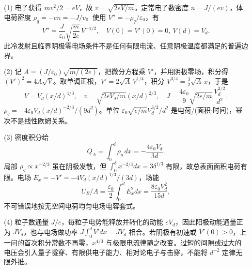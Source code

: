 (1) 电子获得 \(mv^2/2=eV\)，故 \(v=\sqrt{2eV/m}\)。定常电子数密度 \(n=J/(ev)\)，体电荷密度 \(\rho_q=-en=-J/v\)。使用 \(V''=-\rho_q/\varepsilon_0\)，有
\[
\boxed{V''=\frac J{\varepsilon_0}\sqrt{\frac m{2e}}\,V^{-1/2}},\quad V(0)=V'(0)=0,\ V(d)=V_d .
\]
此冷发射且临界阴极零电场条件不是任何有限电流、任意阴极温度都满足的普遍边界。

(2) 记 \(A=(J/\varepsilon_0)\sqrt{m/(2e)}\)，把微分方程乘 \(V'\)，并用阴极零场，积分得 \((V')^2=4A\sqrt V\)。取单调正根，\(V'=2\sqrt A\,V^{1/4}\)，积分 \(V^{3/4}=\frac32\sqrt A\,x\)，于是
\[
\boxed{V=V_d(x/d)^{4/3},\quad v=\sqrt{2eV_d/m}(x/d)^{2/3},\quad
J=\frac{4\varepsilon_0}{9}\sqrt{2e/m}\,\frac{V_d^{3/2}}{d^2}.}
\]
\(\rho_q=-4\varepsilon_0 V_d(x/d)^{-2/3}/(9d^2)\)。单位 \(\varepsilon_0\sqrt{e/m} V_d^{3/2}/d^2\) 是电荷/(面积\(\cdot \)时间)，幂次不是线性欧姆关系。

(3) 密度积分给
\[
Q_A=\int_0^d\rho_q\,dx=-\frac{4\varepsilon_0V_d}{3d}.
\]
局部 \(\rho_q\propto x^{-2/3}\) 虽在阴极发散，但 \(\int_0^\delta x^{-2/3}dx=3\delta^{1/3}\) 有限，故总表面面积电荷有限。电场 \(E_x=-V'=-4V_d(x/d)^{1/3}/(3d)\)，场能
\[
\boxed{U_E/A=\frac{\varepsilon_0}{2}\int_0^d E_x^2dx
=\frac{8\varepsilon_0V_d^2}{15d}},
\]
不可错误地按无空间电荷均匀电场电容套式。

(4) 粒子数通量 \(J/e\)，每粒子电势能释放并转化的动能 \(eV_d\)，因此阳极动能通量正为 \(JV_d\)，也与电场做功率 \(J\int_0^d V'dx=JV_d\) 相合。若阴极有初速或 \(V'(0)>0\)，上一问的首次积分常数不再零，\(x^{4/3}\) 与极限电流律随之改变。过短的间隙或过大的电压会引入量子隧穿、有限供电子能力、相对论电子与击穿，不能将 \(d^{-2}\) 定律无限外推。
